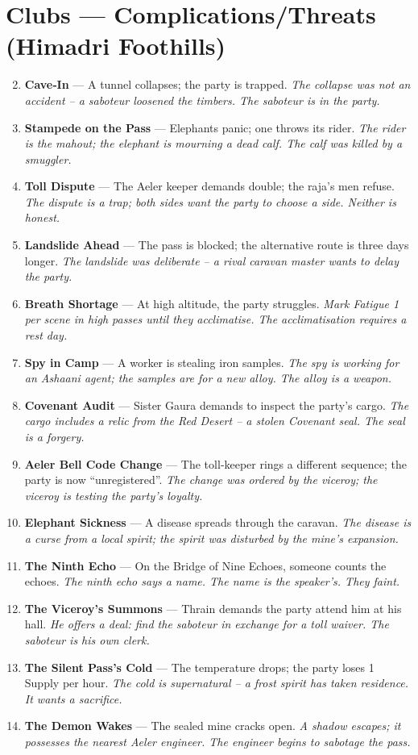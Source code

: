 \documentclass[11pt]{book}
\begin{document}
\section*{Clubs — Complications/Threats (Himadri Foothills)}
\begin{enumerate}
\setcounter{enumi}{1}
\item \textbf{Cave‑In} — A tunnel collapses; the party is trapped. \textit{The collapse was not an accident – a saboteur loosened the timbers. The saboteur is in the party.}
\item \textbf{Stampede on the Pass} — Elephants panic; one throws its rider. \textit{The rider is the mahout; the elephant is mourning a dead calf. The calf was killed by a smuggler.}
\item \textbf{Toll Dispute} — The Aeler keeper demands double; the raja’s men refuse. \textit{The dispute is a trap; both sides want the party to choose a side. Neither is honest.}
\item \textbf{Landslide Ahead} — The pass is blocked; the alternative route is three days longer. \textit{The landslide was deliberate – a rival caravan master wants to delay the party.}
\item \textbf{Breath Shortage} — At high altitude, the party struggles. \textit{Mark Fatigue 1 per scene in high passes until they acclimatise. The acclimatisation requires a rest day.}
\item \textbf{Spy in Camp} — A worker is stealing iron samples. \textit{The spy is working for an Ashaani agent; the samples are for a new alloy. The alloy is a weapon.}
\item \textbf{Covenant Audit} — Sister Gaura demands to inspect the party’s cargo. \textit{The cargo includes a relic from the Red Desert – a stolen Covenant seal. The seal is a forgery.}
\item \textbf{Aeler Bell Code Change} — The toll‑keeper rings a different sequence; the party is now “unregistered”. \textit{The change was ordered by the viceroy; the viceroy is testing the party’s loyalty.}
\item \textbf{Elephant Sickness} — A disease spreads through the caravan. \textit{The disease is a curse from a local spirit; the spirit was disturbed by the mine’s expansion.}
\item[J] \textbf{The Ninth Echo} — On the Bridge of Nine Echoes, someone counts the echoes. \textit{The ninth echo says a name. The name is the speaker’s. They faint.}
\item[Q] \textbf{The Viceroy’s Summons} — Thrain demands the party attend him at his hall. \textit{He offers a deal: find the saboteur in exchange for a toll waiver. The saboteur is his own clerk.}
\item[K] \textbf{The Silent Pass’s Cold} — The temperature drops; the party loses 1 Supply per hour. \textit{The cold is supernatural – a frost spirit has taken residence. It wants a sacrifice.}
\item[A] \textbf{The Demon Wakes} — The sealed mine cracks open. \textit{A shadow escapes; it possesses the nearest Aeler engineer. The engineer begins to sabotage the pass.}
\end{enumerate}
\end{document}

